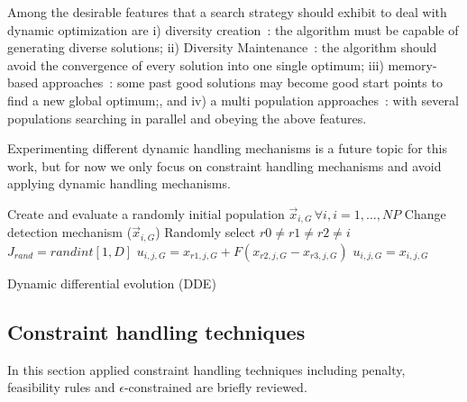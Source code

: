 \documentclass[review]{elsarticle}
\begin{document}
Among the desirable features that a search strategy should exhibit
to deal with dynamic optimization are i) diversity creation~\citep{Goh_2009}:
the algorithm must be capable of generating diverse solutions; ii) Diversity Maintenance~\citep{Bui2005}: the algorithm should avoid the convergence of every solution into one single optimum; iii) memory-based approaches~\citep{Richter2013}: some past good solutions may become good start points to find a new global optimum;, and iv) a multi population approaches~\cite{branke2000multi}: with several populations searching in parallel and obeying the above features.

Experimenting different dynamic handling mechanisms is a future topic for this work, but for now we only focus on constraint handling mechanisms and avoid applying dynamic handling mechanisms. 

\begin{algorithm}[t]
\small
\begin{algorithmic}[1]
	 \STATE Create and evaluate a randomly initial population $\vec{x}_{i,G}\,\forall i, i=1, \ldots, NP$
				\STATE Change detection mechanism ($\vec{x}_{i,G}$)				
				\STATE Randomly select $r0 \neq r1 \neq r2 \neq i$
				\STATE $J_{rand} = randint [1,D]$
						\STATE $u_{i,j,G} = x_{r1,j,G} + F(x_{r2,j,G} - x_{r3,j,G}) $
					\ELSE
						\STATE $u_{i,j,G} = x_{i,j,G}$
					\ENDIF
				\ENDFOR
			\ENDFOR
		\ENDFOR
\end{algorithmic}
\caption{Dynamic differential evolution (DDE)}
\label{alg:DDE}
\vspace{.1cm}
\end{algorithm}

\subsection{Constraint handling techniques} \label{subsec:comparedAlgs}
In this section applied constraint handling techniques including penalty, feasibility rules and $\epsilon$-constrained are briefly reviewed.
\end{document}
